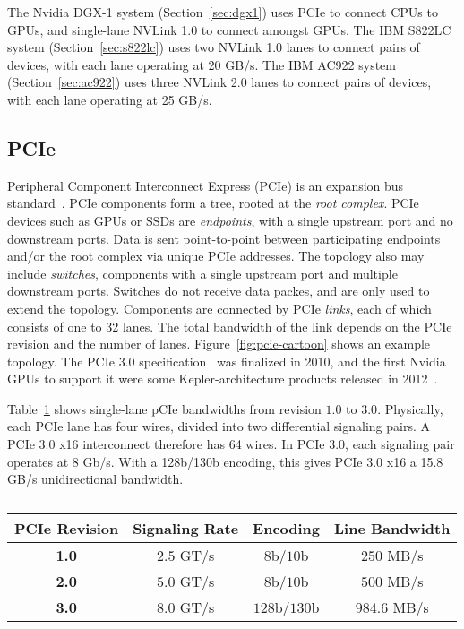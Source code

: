 The Nvidia DGX-1 system (Section~\ref{sec:dgx1}) uses PCIe to connect CPUs to GPUs, and single-lane NVLink 1.0 to connect amongst GPUs.
The IBM S822LC system (Section~\ref{sec:s822lc}) uses two NVLink 1.0 lanes to connect pairs of devices, with each lane operating at 20 GB/s.
The IBM AC922 system (Section~\ref{sec:ac922}) uses three NVLink 2.0 lanes to connect pairs of devices, with each lane operating at 25 GB/s.

\subsection{PCIe}

Peripheral Component Interconnect Express (PCIe) is an expansion bus standard~\cite{pcie10}.
PCIe components form a tree, rooted at the \textit{root complex}.
PCIe devices such as GPUs or SSDs are \textit{endpoints}, with a single upstream port and no downstream ports.
Data is sent point-to-point between participating endpoints and/or the root complex via unique PCIe addresses.
The topology also may include \textit{switches}, components with a single upstream port and multiple downstream ports.
Switches do not receive data packes, and are only used to extend the topology.
Components are connected by PCIe \textit{links}, each of which consists of one to 32 lanes.
The total bandwidth of the link depends on the PCIe revision and the number of lanes.
Figure~\ref{fig:pcie-cartoon} shows an example topology.
The PCIe 3.0 specification~\cite{pcie30} was finalized in 2010, and the first Nvidia GPUs to support it were some Kepler-architecture products released in 2012~\cite{nyland2012inside}.

Table~\ref{tab:pcie-lane-rates} shows single-lane pCIe bandwidths from revision $1.0$ to $3.0$.
Physically, each PCIe lane has four wires, divided into two differential signaling pairs.
A PCIe 3.0 x16 interconnect therefore has 64 wires.
In PCIe 3.0, each signaling pair operates at 8 Gb/s.
With a 128b/130b encoding, this gives PCIe 3.0 x16 a 15.8 GB/s unidirectional bandwidth.

\begin{table}[ht]
	\centering
	\caption[PCIe Lane Transfer Rates]{}
	\label{tab:pcie-lane-rates}
	\begin{tabular}{cccc}
		\hline
		\textbf{PCIe Revision} & \textbf{Signaling Rate} & \textbf{Encoding} & \textbf{Line Bandwidth} \\ \hline
		\textbf{1.0}           & $2.5$ GT/s                & $8$b/$10$b            & $250$   MB/s      \\ \hline
		\textbf{2.0}           & $5.0$ GT/s                & $8$b/$10$b            & $500$   MB/s      \\ \hline
		\textbf{3.0}           & $8.0$ GT/s                & $128$b/$130$b         & $984.6$ MB/s      \\ \hline
	\end{tabular}
\end{table}

